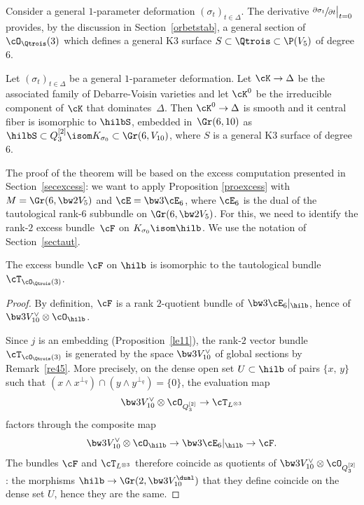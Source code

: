 Consider a general $1$-parameter deformation $(\sigma_t)_{t\in \Delta}$. The
derivative $ \sfrac{\partial\sigma_t}{\partial t}\big\vert_{t=0}$ provides, by the discussion in Section~\ref{orbetstab}, a general section of
$\cO_{\Qtrois}(3)$
which defines a general
K3 surface $S\subset \Qtrois\subset \P(V_5)$ of degree 6.

\begin{theo}\label{theoprecis}
Let $(\sigma_t)_{t\in \Delta}$ be a general $1$-parameter deformation.
Let $\cK\to\Delta$ be the associated family of Debarre-Voisin varieties and let $\cK^0$ be the irreducible component of $\cK$ that dominates~$\Delta$.
Then $\cK^0\to \Delta$
is smooth and it central fiber is isomorphic to $\hilbS$, embedded in~$\Gr(6,10)$ as $\hilbS\subset Q_3^{[2]}\isom K_{\sigma_0}\subset \Gr(6,V_{10})$, where
$S$ is a general K3 surface of degree $6$.
\end{theo}

The proof of the theorem will be based on the excess computation presented in Section~\ref{secexcess}: we want to
apply Proposition \ref{proexcess} with $M=\Gr (6,\bw2 V_5)$ and $\cE=\bw3 \cE_6$, where $\cE_6$ is the dual of the tautological rank-6 subbundle on $\Gr (6,\bw2 V_5)$.
For this, we need to identify the rank-$2$ excess bundle~$\cF$ on $K_{\sigma_0}\isom\hilb$. We use the notation of Section~\ref{sectaut}.

\begin{prop}\label{Festtauto3}
The excess bundle $\cF$ on $\hilb$ is isomorphic to the tautological
bundle $\cT_{\cO_{\Qtrois}(3)}$.
\end{prop}

\begin{proof}
By definition, $\cF$ is a rank $2$-quotient bundle of $\bw3\cE_6\vert_{ \hilb}$, hence of \hbox{$\bw3V_{10}^\vee\otimes \cO_{\hilb}$}.

Since $j$ is an embedding (Proposition~\ref{le11}), the rank-$2$ vector bundle $\cT_{\cO_{\Qtrois}(3)}$ is generated by the space
$
\bw3 V_{10}^\vee$ of global sections by Remark~\ref{re45}. More precisely, on the dense open set $U\subset \hilb$ of pairs
$\{x,\,y\}$ such that $(x\wedge x^{\perp_q} )\cap( y\wedge y^{\perp_q})=\{0\}$, the evaluation map
\begin{equation}\label{eq17}
\bw3V_{10}^\vee\otimes \cO_{Q_3^{[2]}}\to \cT_{L^{\otimes 3}}
\end{equation}
factors through the composite map
\begin{equation}\label{eq18}
\bw3V_{10}^\vee\otimes \cO_{\hilb}\to \bw3\cE_6\vert_{ \hilb}\to \cF.
\end{equation}
The bundles $\cF$ and $\cT_{L^{\otimes 3}}$ therefore coincide as quotients of $\bw3V_{10}^\vee\otimes \cO_{Q_3^{[2]}}$: the morphisms $\hilb\to \Gr(2,\bw3 V_{10}^\dual)$ that they define coincide on the dense set $U$, hence they are the same.
\end{proof}

